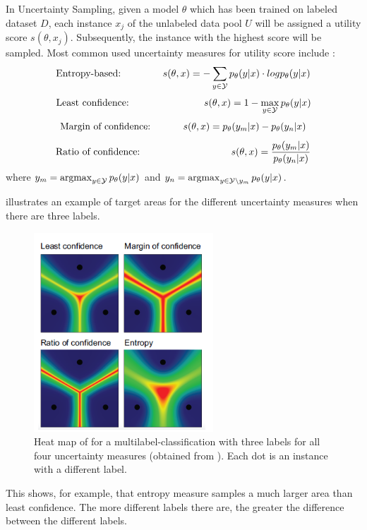 In Uncertainty Sampling, given a model $\theta$ which has been trained on labeled dataset $D$, each instance $x_j$ of the unlabeled data pool $U$ will be assigned a utility score $s(\theta, x_j)$.
Subsequently, the instance with the highest score will be sampled.
Most common used  uncertainty measures for utility score include \cite{human-in-the-loop}:
\begin{equation}
    \text{Entropy-based:}\hspace{15mm}
     s(\theta, x) = - \sum_{y \in \mathcal{Y}}{p_{\theta}(y | x) \cdot log p_{\theta}(y|x)}
\end{equation}
\begin{equation}
    \text{Least confidence:}\hspace{27mm}
     s(\theta, x) = 1 - \max_{y \in \mathcal{Y}}{p_{\theta}(y | x)}
\end{equation}
\begin{equation}
    \text{Margin of confidence:}\hspace{12mm}
    s(\theta, x) = p_{\theta}(y_m | x) - p_{\theta}(y_n|x)
\end{equation}
\begin{equation}
    \text{Ratio of confidence:}\hspace{33mm}
    s(\theta, x) = \frac{p_{\theta}(y_m | x)}{p_{\theta}(y_n|x)}
\end{equation}
where
$y_m = \operatorname*{argmax}_{y \in \mathcal{Y}} p_{\theta}(y | x)$ 
and 
$y_n = \operatorname*{argmax}_{y \in \mathcal{Y} \setminus y_m}{p_{\theta}(y | x)}$.

 illustrates an example of target areas for the different uncertainty measures when there are three labels.
\begin{figure}[t]
  \centering
    \includegraphics[width=0.60\textwidth]{figures/uncertainty_sampling_heatmap.PNG}
  \caption{Heat map of for a multilabel-classification with three labels for all four uncertainty measures (obtained from \cite{human-in-the-loop}).
  Each dot is an instance with a different label.}
  \label{fig:uncertainty_sampling_heatmap}
\end{figure}
This shows, for example, that entropy measure samples a much larger area than least confidence.
The more different labels there are, the greater the difference between the different labels.

